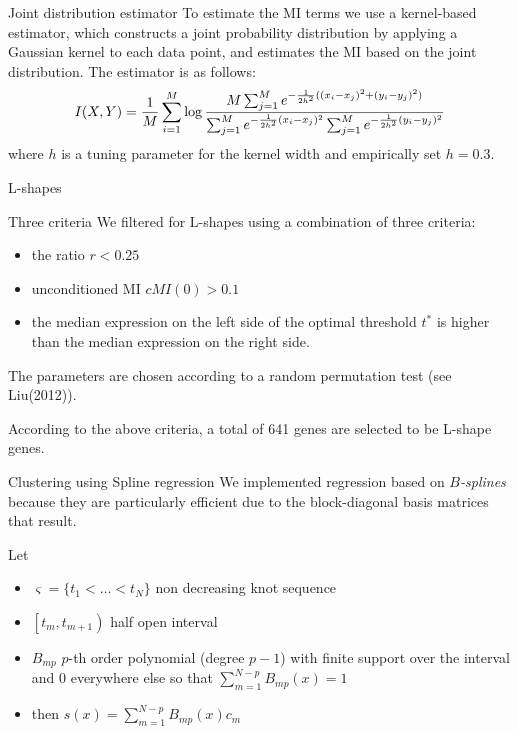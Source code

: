 \documentclass[handout]{beamer}
\begin{document}
\begin{frame}{Joint distribution estimator}
To estimate the MI terms we use a kernel-based estimator, which constructs a joint
probability distribution by applying a Gaussian kernel to each data point, and estimates
the MI based on the joint distribution. The estimator is as follows:
\[
I(X,Y) = \frac 1M \sum_{i=1}^M \log\frac{M\sum_{j=1}^M e^{-\frac{1}{2h^2}((x_i-x_j)^2+(y_i-y_j)^2)}}{%
                                      \sum_{j=1}^M e^{-\frac{1}{2h^2}(x_i-x_j)^2} \sum_{j=1}^M e^{-\frac{1}{2h^2}(y_i-y_j)^2}}
\]
where $h$ is a tuning parameter for the kernel width and empirically set $h=0.3$.
\end{frame}

\begin{frame}{L-shapes}
\begin{block}{Three criteria}
We filtered for L-shapes using a combination of three criteria:
\begin{itemize}
\item the ratio $r<0.25$
\item unconditioned MI $\mathit{cMI}(0)>0.1$
\item the median expression on the left side of the optimal threshold $t^{\ast}$ is higher
than the median expression on the right side.
\end{itemize}
\end{block}
The parameters are chosen according to a random permutation test (see Liu(2012)).

According to the above criteria, a total of 641 genes are selected to be L-shape genes.
\end{frame}

\begin{frame}{Clustering using Spline regression }
We implemented regression based on  \textit{$B$-splines} because they are particularly efficient due to the block-diagonal basis matrices that result.

Let 
\begin {itemize}
\item $\varsigma=\lbrace t_1 < \ldots < t_N \rbrace$ non decreasing  knot sequence 
\item $\left[ t_m,t_{m+1} \right)$ half open interval
\item $B_{mp}$ $p$-th order polynomial (degree $p-1$) with finite support over the interval and 0 everywhere else so that  $\sum_{m=1}^{N-p}B_{mp}(x)=1$
\item then  $s(x)=\sum_{m=1}^{N-p}B_{mp}(x)c_m$ 
\end{itemize}
\end{frame}
\end{document}
